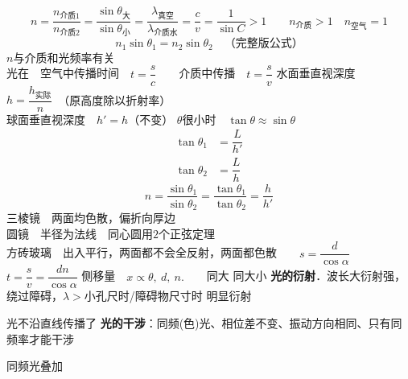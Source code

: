 \[
n=\dfrac{n_{\text{介质1}}}{n_{\text{介质2}}}=\dfrac{\sin\theta_{\text{大}}}{\sin\theta_{\text{小}}}=\dfrac{\lambda_{\text{真空}}}{\lambda_{\text{介质水}}}=\dfrac{c}{v}=\dfrac{1}{\sin C}>1
\qquad n_{\text{介质}}>1\quad n_{\text{空气}}=1
\]
\[
n_1\sin\theta_1=n_2\sin\theta_2\quad\text{（完整版公式）}
\]
$n$与介质和光频率有关\\[1ex]
光在　空气中传播时间　$t=\dfrac{s}{c}$　　介质中传播　$t=\dfrac{s}{v}$
水面垂直视深度　$h=\dfrac{h_{\text{实际}}}{n}$　（原高度除以折射率）\\[0.8ex]
球面垂直视深度　$h'=h$（不变）
$\theta$很小时　$\tan\theta\approx\sin\theta$
\begin{align*}
\tan\theta_1&=\dfrac{L}{h'}\\
\tan\theta_2&=\dfrac{L}{h}
\end{align*}
\[
n=\dfrac{\sin\theta_1}{\sin\theta_2}=\dfrac{\tan\theta_1}{\tan\theta_2}=\dfrac{h}{h'}
\]
三棱镜　两面均色散，偏折向厚边\\
圆镜　半径为法线　同心圆用$2$个正弦定理\\
方砖玻璃　出入平行，两面都不会全反射，两面都色散　　$s=\dfrac{d}{\cos\alpha}$　　$t=\dfrac{s}{v}=\dfrac{dn}{\cos\alpha}$ %
侧移量　$x\propto\theta,\ d,\ n.$　　同大
\quad {} 同大小
\textbf{光的衍射}．波长大衍射强，绕过障碍，$\lambda>$小孔尺时/障碍物尺寸时 明显衍射

光不沿直线传播了
\textbf{光的干涉}：同频(色)光、相位差不变、振动方向相同、只有同频率才能干涉

\quad 同频光叠加

